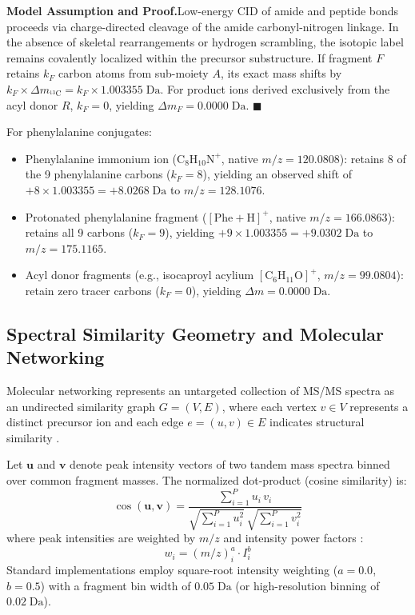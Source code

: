 \documentclass[11pt,twoside,openright]{book}
\begin{document}
\vspace{0.4em}
\noindent\textbf{Model Assumption and Proof.}\enspace Low-energy CID of amide and peptide bonds proceeds via charge-directed cleavage of the amide carbonyl-nitrogen linkage. In the absence of skeletal rearrangements or hydrogen scrambling, the isotopic label remains covalently localized within the precursor substructure. If fragment $F$ retains $k_F$ carbon atoms from sub-moiety $A$, its exact mass shifts by $k_F \times \Delta m_{^{13}\text{C}} = k_F \times 1.003355\;\text{Da}$. For product ions derived exclusively from the acyl donor $R$, $k_F = 0$, yielding $\Delta m_F = 0.0000\;\text{Da}$. \hfill $\blacksquare$

\vspace{0.6em}
For phenylalanine conjugates:
\begin{itemize}
    \item Phenylalanine immonium ion ($\text{C}_8\text{H}_{10}\text{N}^+$, native $m/z = 120.0808$): retains 8 of the 9 phenylalanine carbons ($k_F = 8$), yielding an observed shift of $+8 \times 1.003355 = +8.0268\;\text{Da}$ to $m/z = 128.1076$.
    \item Protonated phenylalanine fragment ($[\text{Phe}+\text{H}]^+$, native $m/z = 166.0863$): retains all 9 carbons ($k_F = 9$), yielding $+9 \times 1.003355 = +9.0302\;\text{Da}$ to $m/z = 175.1165$.
    \item Acyl donor fragments (e.g., isocaproyl acylium $[\text{C}_6\text{H}_{11}\text{O}]^+$, $m/z = 99.0804$): retain zero tracer carbons ($k_F = 0$), yielding $\Delta m = 0.0000\;\text{Da}$.
\end{itemize}

\subsection{Spectral Similarity Geometry and Molecular Networking}

Molecular networking represents an untargeted collection of MS/MS spectra as an undirected similarity graph $G = (V, E)$, where each vertex $v \in V$ represents a distinct precursor ion and each edge $e = (u, v) \in E$ indicates structural similarity \cite{wang2016sharing}.

Let $\mathbf{u}$ and $\mathbf{v}$ denote peak intensity vectors of two tandem mass spectra binned over common fragment masses. The normalized dot-product (cosine similarity) is:
\begin{equation}
\cos(\mathbf{u}, \mathbf{v}) = \frac{\sum_{i=1}^P u_i \, v_i}{\sqrt{\sum_{i=1}^P u_i^2} \, \sqrt{\sum_{i=1}^P v_i^2}}
\label{eq:cosine_similarity}
\end{equation}
where peak intensities are weighted by $m/z$ and intensity power factors \cite{wang2016sharing}:
\begin{equation}
w_i = (m/z)_i^a \cdot I_i^b
\end{equation}
Standard implementations employ square-root intensity weighting ($a = 0.0$, $b = 0.5$) with a fragment bin width of $0.05\;\text{Da}$ (or high-resolution binning of $0.02\;\text{Da}$).
\end{document}
